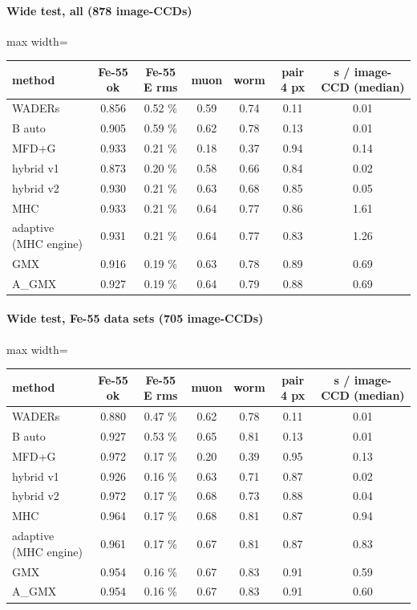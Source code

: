 \paragraph{Wide test, all (878 image-CCDs)}
\begin{table}[H]\centering\footnotesize
\begin{adjustbox}{max width=\linewidth}
\begin{tabular}{lcccccc}
\toprule
method & Fe-55 ok & Fe-55 E rms & muon & worm & pair 4 px & s / image-CCD (median) \\
\midrule
WADERs & 0.856 & 0.52 \% & 0.59 & 0.74 & 0.11 & 0.01 \\
B auto & 0.905 & 0.59 \% & 0.62 & 0.78 & 0.13 & 0.01 \\
MFD+G & 0.933 & 0.21 \% & 0.18 & 0.37 & 0.94 & 0.14 \\
hybrid v1 & 0.873 & 0.20 \% & 0.58 & 0.66 & 0.84 & 0.02 \\
hybrid v2 & 0.930 & 0.21 \% & 0.63 & 0.68 & 0.85 & 0.05 \\
MHC & 0.933 & 0.21 \% & 0.64 & 0.77 & 0.86 & 1.61 \\
adaptive (MHC engine) & 0.931 & 0.21 \% & 0.64 & 0.77 & 0.83 & 1.26 \\
GMX & 0.916 & 0.19 \% & 0.63 & 0.78 & 0.89 & 0.69 \\
A\_GMX & 0.927 & 0.19 \% & 0.64 & 0.79 & 0.88 & 0.69 \\
\bottomrule
\end{tabular}
\end{adjustbox}
\end{table}

\paragraph{Wide test, Fe-55 data sets (705 image-CCDs)}
\begin{table}[H]\centering\footnotesize
\begin{adjustbox}{max width=\linewidth}
\begin{tabular}{lcccccc}
\toprule
method & Fe-55 ok & Fe-55 E rms & muon & worm & pair 4 px & s / image-CCD (median) \\
\midrule
WADERs & 0.880 & 0.47 \% & 0.62 & 0.78 & 0.11 & 0.01 \\
B auto & 0.927 & 0.53 \% & 0.65 & 0.81 & 0.13 & 0.01 \\
MFD+G & 0.972 & 0.17 \% & 0.20 & 0.39 & 0.95 & 0.13 \\
hybrid v1 & 0.926 & 0.16 \% & 0.63 & 0.71 & 0.87 & 0.02 \\
hybrid v2 & 0.972 & 0.17 \% & 0.68 & 0.73 & 0.88 & 0.04 \\
MHC & 0.964 & 0.17 \% & 0.68 & 0.81 & 0.87 & 0.94 \\
adaptive (MHC engine) & 0.961 & 0.17 \% & 0.67 & 0.81 & 0.87 & 0.83 \\
GMX & 0.954 & 0.16 \% & 0.67 & 0.83 & 0.91 & 0.59 \\
A\_GMX & 0.954 & 0.16 \% & 0.67 & 0.83 & 0.91 & 0.60 \\
\bottomrule
\end{tabular}
\end{adjustbox}
\end{table}

